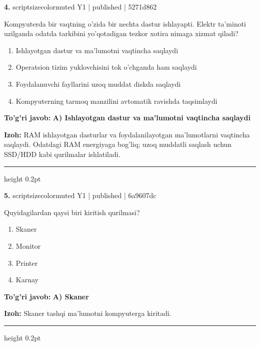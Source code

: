 \documentclass[10pt,a4paper]{article}
\begin{document}
{\bfseries\sffamily\color{ink} 4.} {scriptsizecolor{muted} Y1 | published | 5271d862}
\par
Kompyuterda bir vaqtning o'zida bir nechta dastur ishlayapti. Elektr ta'minoti uzilganda odatda tarkibini yo'qotadigan tezkor xotira nimaga xizmat qiladi?
\begin{enumerate}[label=\Alph*),leftmargin=9mm]
\item Ishlayotgan dastur va ma'lumotni vaqtincha saqlaydi
\item Operatsion tizim yuklovchisini tok o'chganda ham saqlaydi
\item Foydalanuvchi fayllarini uzoq muddat diskda saqlaydi
\item Kompyuterning tarmoq manzilini avtomatik ravishda taqsimlaydi
\end{enumerate}
\begin{tcolorbox}[enhanced,breakable,colback=teal!4,colframe=teal!60!black,boxrule=0.45pt,arc=1.2mm,left=2.7mm,right=2.7mm,top=1.8mm,bottom=1.8mm,before skip=2mm,after skip=2mm]
{\bfseries\sffamily\color{teal}To'g'ri javob:} \textbf{A) Ishlayotgan dastur va ma'lumotni vaqtincha saqlaydi}
\par\smallskip
{\bfseries Izoh:} RAM ishlayotgan dasturlar va foydalanilayotgan ma'lumotlarni vaqtincha saqlaydi. Odatdagi RAM energiyaga bog'liq; uzoq muddatli saqlash uchun SSD/HDD kabi qurilmalar ishlatiladi.
\end{tcolorbox}
\vspace{2mm}\hrule height 0.2pt\vspace{3mm}

{\bfseries\sffamily\color{ink} 5.} {scriptsizecolor{muted} Y1 | published | 6a9607dc}
\par
Quyidagilardan qaysi biri kiritish qurilmasi?
\begin{enumerate}[label=\Alph*),leftmargin=9mm]
\item Skaner
\item Monitor
\item Printer
\item Karnay
\end{enumerate}
\begin{tcolorbox}[enhanced,breakable,colback=teal!4,colframe=teal!60!black,boxrule=0.45pt,arc=1.2mm,left=2.7mm,right=2.7mm,top=1.8mm,bottom=1.8mm,before skip=2mm,after skip=2mm]
{\bfseries\sffamily\color{teal}To'g'ri javob:} \textbf{A) Skaner}
\par\smallskip
{\bfseries Izoh:} Skaner tashqi ma'lumotni kompyuterga kiritadi.
\end{tcolorbox}
\vspace{2mm}\hrule height 0.2pt\vspace{3mm}
\end{document}
